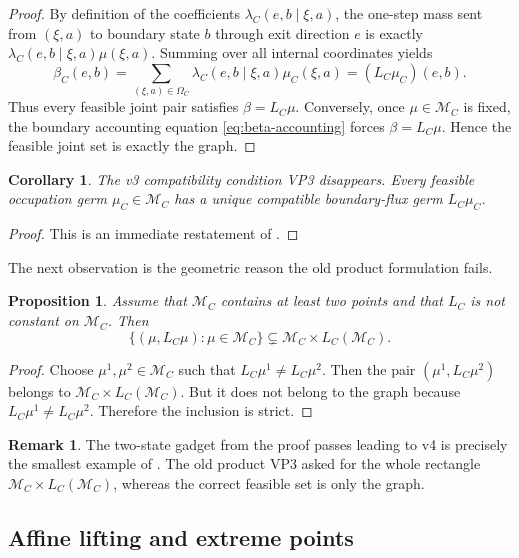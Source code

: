 \documentclass[12pt]{article}
\newtheorem{proposition}[theorem]{Proposition}
\newtheorem{corollary}[theorem]{Corollary}
\theoremstyle{definition}
\newtheorem{remark}[theorem]{Remark}
\newcommand{\1}{\mathbf{1}}
\newcommand{\cM}{\mathcal{M}}
\begin{document}
\begin{proof}
By definition of the coefficients \(\lambda_C(e,b\mid \xi,a)\), the one-step mass sent
from \((\xi,a)\) to boundary state \(b\) through exit direction \(e\) is exactly
\(\lambda_C(e,b\mid \xi,a)\mu(\xi,a)\).  Summing over all internal coordinates yields
\[
\beta_C(e,b)=\sum_{(\xi,a)\in \Omega_C}\lambda_C(e,b\mid \xi,a)\mu_C(\xi,a)=(L_C\mu_C)(e,b).
\]
Thus every feasible joint pair satisfies \(\beta=L_C\mu\).  Conversely, once
\(\mu\in \cM_C\) is fixed, the boundary accounting equation
\eqref{eq:beta-accounting} forces \(\beta=L_C\mu\).  Hence the feasible joint set is
exactly the graph.
\end{proof}

\begin{corollary}
\label{cor:automatic}
The v3 compatibility condition VP3 disappears.  Every feasible occupation germ
\(\mu_C\in \cM_C\) has a unique compatible boundary-flux germ \(L_C\mu_C\).
\end{corollary}

\begin{proof}
This is an immediate restatement of .
\end{proof}

The next observation is the geometric reason the old product formulation fails.

\begin{proposition}
\label{prop:product-fails}
Assume that \(\cM_C\) contains at least two points and that \(L_C\) is not constant on
\(\cM_C\).  Then
\[
\{(\mu,L_C\mu):\mu\in \cM_C\}
\subsetneq
\cM_C\times L_C(\cM_C).
\]
\end{proposition}

\begin{proof}
Choose \(\mu^1,\mu^2\in \cM_C\) such that \(L_C\mu^1\neq L_C\mu^2\).  Then the pair
\((\mu^1,L_C\mu^2)\) belongs to \(\cM_C\times L_C(\cM_C)\).  But it does not belong to
the graph because \(L_C\mu^1\neq L_C\mu^2\).  Therefore the inclusion is strict.
\end{proof}

\begin{remark}
The two-state gadget from the proof passes leading to v4 is precisely the smallest example
of .  The old product VP3 asked for the whole rectangle
\(\cM_C\times L_C(\cM_C)\), whereas the correct feasible set is only the graph.
\end{remark}

\subsection{Affine lifting and extreme points}
\end{document}
